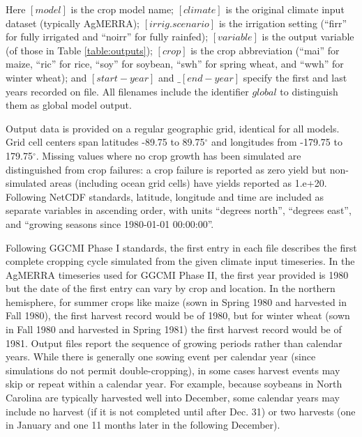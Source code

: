 \documentclass[gmd, manuscript]{copernicus} %
\begin{document}
\noindent Here $[model]$ is the crop model name; $[climate]$ is the original climate input dataset (typically AgMERRA); $[irrig.scenario]$ is the irrigation setting (``firr'' for fully irrigated and ``noirr'' for fully rainfed); $[variable]$ is the output variable (of those in Table \ref{table:outputs}); $[crop]$ is the crop abbreviation (``mai'' for maize, ``ric'' for rice, ``soy'' for soybean, ``swh'' for spring wheat, and ``wwh'' for winter wheat); and $[start-year]$ and $\_[end-year]$ specify the first and last years recorded on file.
All filenames include the identifier $global$ to distinguish them as global model output.

Output data is provided on a regular geographic grid, identical for all models. 
Grid cell centers span latitudes -89.75 to 89.75$^{\circ}$ and longitudes from -179.75 to 179.75$^{\circ}$. 
Missing values  where no crop growth has been simulated are distinguished from crop failures: a crop failure is reported as zero yield but non-simulated areas (including ocean grid cells) have yields reported as 1.e+20. 
Following NetCDF standards, latitude, longitude and time are included as separate variables in ascending order, with
units ``degrees north'', ``degrees east'', and ``growing seasons since 1980-01-01 00:00:00''. 

Following GGCMI Phase I standards, the first entry in each file describes the first complete cropping cycle simulated from the given climate input timeseries. 
In the AgMERRA timeseries used for GGCMI Phase II, the first year provided is 1980 but the date of the first entry can vary by crop and location. 
In the northern hemisphere, for summer crops like maize (sown in Spring 1980 and harvested in Fall 1980), the first harvest record would be of 1980, but for winter wheat (sown in Fall 1980 and harvested in Spring 1981) the first harvest record would be of 1981. Output files report the sequence of growing periods rather than calendar years. 
While there is generally one sowing event per calendar year (since simulations do not permit double-cropping), in some cases harvest events may skip or repeat within a calendar year. For example, because soybeans in North Carolina are typically harvested well into December, some calendar years may include no harvest (if it is not completed until after Dec. 31) or two harvests (one in January and one 11 months later in the following December). 
\end{document}

